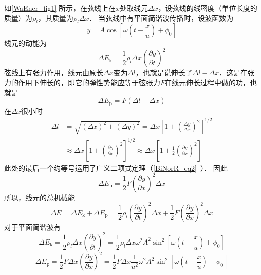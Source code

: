如\autoref{WaEner_fig1} 所示，在弦线上在$x$处取线元$\Delta x$，设弦线的线密度（单位长度的质量）为$\rho_l$，其质量为$\rho_l\Delta x$．
当弦线中有平面简谐波传播时，设波函数为
\begin{equation}
y=A \cos \left[\omega\left(t-\frac{x}{u}\right)+\phi_{0}\right]
\end{equation}
线元的动能为
\begin{equation}
\Delta E_{\mathrm{k}}=\frac{1}{2} \rho_{l} \Delta x\left(\frac{\partial y}{\partial t}\right)^{2}
\end{equation}
弦线上有张力作用，线元由原长$\Delta x$变为$\Delta l$，也就是说伸长了$\Delta l-\Delta x$．这是在张力的作用下伸长的，即它的弹性势能应等于弦张力$F$在线元伸长过程中做的功，也就是
\begin{equation}
\Delta E_{\mathrm{p}}=F(\Delta l-\Delta x)
\end{equation}
在$\Delta x$很小时
\begin{equation}
\begin{aligned} \Delta l &=\sqrt{(\Delta x)^{2}+(\Delta y)^{2}}=\Delta x\left[1+\left(\frac{\Delta y}{\Delta x}\right)^{2}\right]^{1 / 2} \\ & \approx \Delta x\left[1+\left(\frac{\partial y}{\partial x}\right)^{2}\right]^{1 / 2} \approx \Delta x\left[1+\frac{1}{2}\left(\frac{\partial y}{\partial x}\right)^{2}\right] \end{aligned}
\end{equation}
此处的最后一个约等号运用了广义二项式定理（\autoref{BiNorR_eq2}~）．
因此
\begin{equation}
\Delta E_{\mathrm{p}}=\frac{1}{2} F\left(\frac{\partial y}{\partial x}\right)^{2} \Delta x
\end{equation}
所以，线元的总机械能
\begin{equation}
\Delta E=\Delta E_{\mathrm{k}}+\Delta E_{\mathrm{p}}=\frac{1}{2} \rho_{l}\left(\frac{\partial y}{\partial t}\right)^{2} \Delta x+\frac{1}{2} F\left(\frac{\partial y}{\partial x}\right)^{2} \Delta x
\end{equation}
对于平面简谐波有
\begin{equation}
\Delta E_{\mathrm{k}}=\frac{1}{2} \rho_{l} \Delta x\left(\frac{\partial y}{\partial t}\right)^{2}=\frac{1}{2} \rho_{l} \Delta x \omega^{2} A^{2} \sin ^{2}\left[\omega\left(t-\frac{x}{u}\right)+\phi_{0}\right]
\end{equation}
\begin{equation}
\Delta E_{\mathrm{p}}=\frac{1}{2} F \Delta x\left(\frac{\partial y}{\partial x}\right)^{2}=\frac{1}{2} F \Delta x \frac{1}{u^{2}} \omega^{2} A^{2} \sin ^{2}\left[\omega\left(t-\frac{x}{u}\right)+\phi_{0}\right]
\end{equation}
